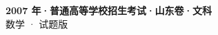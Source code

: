 \documentclass[zihao=-4, a4paper]{ctexart}
\begin{document}
\begin{center}
  {\Large\bfseries 2007 年·普通高等学校招生考试·山东卷·文科}\\[4pt]
  {\large 数学 · 试题版}
\end{center}
\medskip
{}

\end{document}
